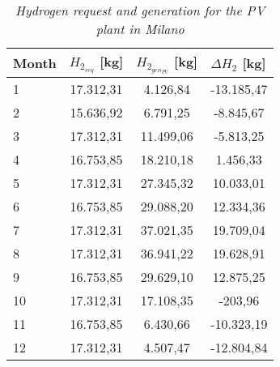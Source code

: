 \begin{table}[hp]
\centering
\begin{tabular}{|l|c|c|c|}
\hline
\rowcolor{bluepoli!40}\textbf{Month} & \multicolumn{1}{l|}{\textbf{$H_{2_{req}}$   [kg]}} & \multicolumn{1}{l|}{\textbf{$H_{2_{gen_{PV}}}$ [kg]}} & \multicolumn{1}{l|}{\textbf{$\Delta H_2$ [kg]}} \\ \hline
1              & 17.312,31              & 4.126,84              & -13.185,47                                     \\ \hline
2              & 15.636,92              & 6.791,25              & -8.845,67                                      \\ \hline
3              & 17.312,31              & 11.499,06             & -5.813,25                                      \\ \hline
4              & 16.753,85              & 18.210,18             & 1.456,33                                       \\ \hline
5              & 17.312,31              & 27.345,32             & 10.033,01                                      \\ \hline
6              & 16.753,85              & 29.088,20             & 12.334,36                                      \\ \hline
7              & 17.312,31              & 37.021,35             & 19.709,04                                      \\ \hline
8              & 17.312,31              & 36.941,22             & 19.628,91                                      \\ \hline
9              & 16.753,85              & 29.629,10             & 12.875,25                                      \\ \hline
10             & 17.312,31              & 17.108,35             & -203,96                                        \\ \hline
11             & 16.753,85              & 6.430,66              & -10.323,19                                     \\ \hline
12             & 17.312,31              & 4.507,47              & -12.804,84                                     \\ \hline
\end{tabular}
\caption{\textit{Hydrogen request and generation for the PV plant in Milano}}
\label{tab:hydrogenmilan}
\end{table}